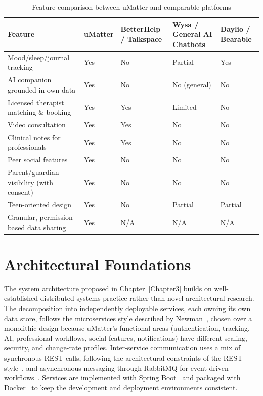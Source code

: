 \begin{table}[ht]
\caption{Feature comparison between uMatter and comparable platforms}
\label{tab:competitive}
\begin{center}
\renewcommand{\arraystretch}{1.5}
\setlength{\tabcolsep}{6pt}
\begin{tabular}{ |L{3.4cm}|C{2.6cm}|C{2.6cm}|C{2.6cm}|C{2.6cm}| }
 \hline
 \textbf{Feature} & \textbf{uMatter} & \textbf{BetterHelp / Talkspace} & \textbf{Wysa / General AI Chatbots} & \textbf{Daylio / Bearable} \\
 \hline
 Mood/sleep/journal tracking & Yes & No & Partial & Yes \\
 \hline
 AI companion grounded in own data & Yes & No & No (general) & No \\
 \hline
 Licensed therapist matching \& booking & Yes & Yes & Limited & No \\
 \hline
 Video consultation & Yes & Yes & No & No \\
 \hline
 Clinical notes for professionals & Yes & Yes & No & No \\
 \hline
 Peer social features & Yes & No & No & No \\
 \hline
 Parent/guardian visibility (with consent) & Yes & No & No & No \\
 \hline
 Teen-oriented design & Yes & No & Partial & Partial \\
 \hline
 Granular, permission-based data sharing & Yes & N/A & N/A & N/A \\
 \hline
\end{tabular}
\end{center}
\end{table}

\section{Architectural Foundations}

The system architecture proposed in Chapter~\ref{Chapter3} builds on well-established distributed-systems practice rather than novel architectural research. The decomposition into independently deployable services, each owning its own data store, follows the microservices style described by Newman~\cite{2021-Newman-Microservices}, chosen over a monolithic design because uMatter's functional areas (authentication, tracking, AI, professional workflows, social features, notifications) have different scaling, security, and change-rate profiles. Inter-service communication uses a mix of synchronous REST calls, following the architectural constraints of the REST style~\cite{2000-Fielding-REST}, and asynchronous messaging through RabbitMQ for event-driven workflows~\cite{RabbitMQ}. Services are implemented with Spring Boot~\cite{SpringBoot} and packaged with Docker~\cite{Docker} to keep the development and deployment environments consistent.

